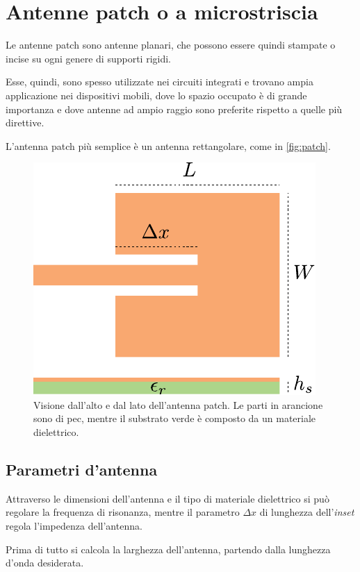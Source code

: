 \chapter{Antenne patch o a microstriscia}
Le antenne patch sono antenne planari, che possono essere quindi stampate o incise su ogni genere di supporti rigidi.

Esse, quindi, sono spesso utilizzate nei circuiti integrati e trovano ampia applicazione nei dispositivi mobili, dove lo spazio occupato è di grande importanza e dove antenne ad ampio raggio sono preferite rispetto a quelle più direttive.

L'antenna patch più semplice è un antenna rettangolare, come in \autoref{fig:patch}.

\begin{figure}[htp]
	\centering
	\includegraphics[]{img/patch.pdf}
	\caption{Visione dall'alto e dal lato dell'antenna patch. Le parti in arancione sono di \gls{pec}, mentre il substrato verde è composto da un materiale dielettrico.}
	\label{fig:patch}
\end{figure}

\section{Parametri d'antenna}

Attraverso le dimensioni dell'antenna e il tipo di materiale dielettrico si può regolare la frequenza di risonanza, mentre il parametro $\Delta x$ di lunghezza dell'\emph{inset} regola l'impedenza dell'antenna.

Prima di tutto si calcola la larghezza dell'antenna, partendo dalla lunghezza d'onda desiderata.


